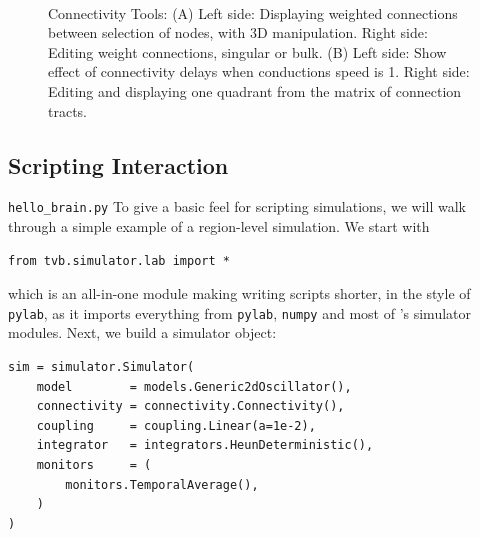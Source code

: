  \begin{figure}[!htbp]
 	\centering
	\\
	\caption{Connectivity Tools: 
	(A) Left side: Displaying weighted connections between selection of nodes, with 3D manipulation.
	Right side: Editing weight connections, singular or bulk.
	(B) Left side: Show effect of connectivity delays when conductions speed is 1.
	Right side: Editing and displaying one quadrant from the matrix of connection tracts.}
        \label{fig:connectivity}
\end{figure}



\subsection{Scripting Interaction}

\texttt{hello\_brain.py}
To give a basic feel for scripting \TVB simulations, we will 
walk through a simple example of a region-level simulation. We 
start with

\begin{lstlisting}
from tvb.simulator.lab import *
\end{lstlisting}

\noindent which is an all-in-one module making writing scripts
shorter, in the style of \texttt{pylab}, as it imports everything
from \texttt{pylab}, \texttt{numpy} and most of \TVB's simulator
modules. Next, we build a simulator object:

\begin{lstlisting}
sim = simulator.Simulator(
    model        = models.Generic2dOscillator(), 
    connectivity = connectivity.Connectivity(),
    coupling     = coupling.Linear(a=1e-2),
    integrator   = integrators.HeunDeterministic(),
    monitors     = (
        monitors.TemporalAverage(), 
    )
)
\end{lstlisting}

